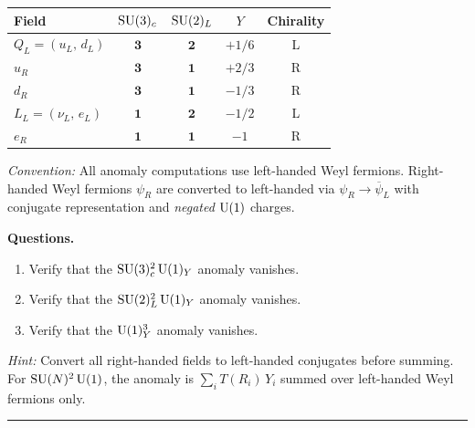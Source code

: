 \documentclass[11pt,a4paper]{article}
\begin{document}
\begin{center}
\renewcommand{\arraystretch}{1.3}
\begin{tabular}{@{}l c c c c@{}}
\toprule
\textbf{Field} & $\mathrm{SU}(3)_c$ & $\mathrm{SU}(2)_L$ & $Y$ & Chirality \\
\midrule
$Q_L = (u_L,\, d_L)$ & $\mathbf{3}$ & $\mathbf{2}$ & $+1/6$ & L \\
$u_R$ & $\mathbf{3}$ & $\mathbf{1}$ & $+2/3$ & R \\
$d_R$ & $\mathbf{3}$ & $\mathbf{1}$ & $-1/3$ & R \\
$L_L = (\nu_L,\, e_L)$ & $\mathbf{1}$ & $\mathbf{2}$ & $-1/2$ & L \\
$e_R$ & $\mathbf{1}$ & $\mathbf{1}$ & $-1$ & R \\
\bottomrule
\end{tabular}
\end{center}

\noindent\textit{Convention:} All anomaly computations use left-handed Weyl
fermions.  Right-handed Weyl fermions $\psi_R$ are converted to left-handed
via $\psi_R \to \overline{\psi}_L$ with conjugate representation and
\emph{negated} $\mathrm{U}(1)$ charges.

\medskip
\noindent\textbf{Questions.}
\begin{enumerate}[label=(\alph*)]
  \item Verify that the $\mathrm{SU}(3)_c^2\,\mathrm{U}(1)_Y$ anomaly vanishes.
  \item Verify that the $\mathrm{SU}(2)_L^2\,\mathrm{U}(1)_Y$ anomaly vanishes.
  \item Verify that the $\mathrm{U}(1)_Y^3$ anomaly vanishes.
\end{enumerate}

\noindent\textit{Hint:} Convert all right-handed fields to left-handed
conjugates before summing.  For $\mathrm{SU}(N)^2\,\mathrm{U}(1)$, the anomaly is
$\sum_i T(R_i)\,Y_i$ summed over left-handed Weyl fermions only.

\bigskip
\hrule
\bigskip
\end{document}

